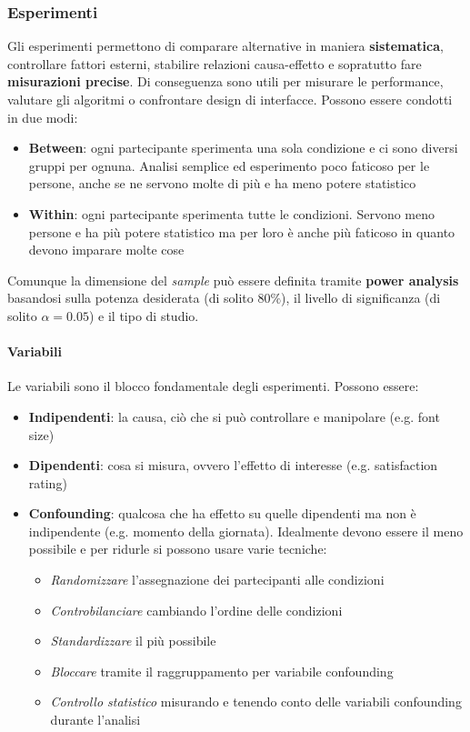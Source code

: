 \subsubsection{Esperimenti}
Gli esperimenti permettono di comparare alternative in maniera \textbf{sistematica}, controllare fattori esterni, stabilire relazioni causa-effetto e sopratutto fare \textbf{misurazioni precise}. Di conseguenza sono utili per misurare le performance, valutare gli algoritmi o confrontare design di interfacce. Possono essere condotti in due modi:
\begin{itemize}
	\item \textbf{Between}: ogni partecipante sperimenta una sola condizione e ci sono diversi gruppi per ognuna. Analisi semplice ed esperimento poco faticoso per le persone, anche se ne servono molte di più e ha meno potere statistico
	\item \textbf{Within}: ogni partecipante sperimenta tutte le condizioni. Servono meno persone e ha più potere statistico ma per loro è anche più faticoso in quanto devono imparare molte cose
\end{itemize}
Comunque la dimensione del \textit{sample} può essere definita tramite \textbf{power analysis} basandosi sulla potenza desiderata (di solito $80\%$), il livello di significanza (di solito $\alpha = 0.05$) e il tipo di studio.
\paragraph{Variabili} Le variabili sono il blocco fondamentale degli esperimenti. Possono essere:
\begin{itemize}
	\item \textbf{Indipendenti}: la causa, ciò che si può controllare e manipolare (e.g. font size)
	\item \textbf{Dipendenti}: cosa si misura, ovvero l'effetto di interesse (e.g. satisfaction rating)
	\item \textbf{Confounding}: qualcosa che ha effetto su quelle dipendenti ma non è indipendente (e.g. momento della giornata). Idealmente devono essere il meno possibile e per ridurle si possono usare varie tecniche:
	\begin{itemize}
		\item \textit{Randomizzare} l'assegnazione dei partecipanti alle condizioni
		\item \textit{Controbilanciare} cambiando l'ordine delle condizioni
		\item \textit{Standardizzare} il più possibile
		\item \textit{Bloccare} tramite il raggruppamento per variabile confounding
		\item \textit{Controllo statistico} misurando e tenendo conto delle variabili confounding durante l'analisi
	\end{itemize}
\end{itemize}

